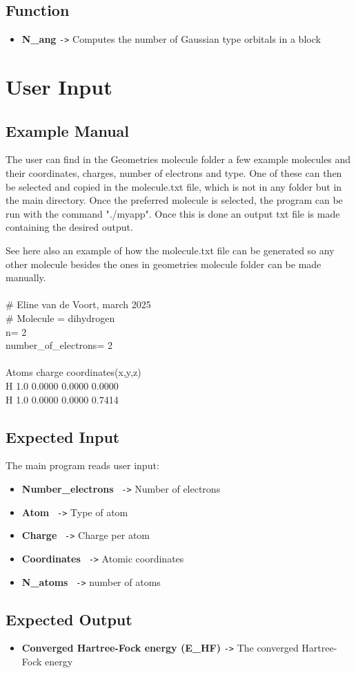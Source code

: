 \documentclass[11pt,a4paper]{article}
\begin{document}
\subsection*{Function}
\begin{itemize}
    \item \textbf{N\_ang} \texttt{->} Computes the number of Gaussian type orbitals in a block
\end{itemize}

\section*{User Input}
\subsection*{Example Manual}
The user can find in the Geometries molecule folder a few example molecules and their coordinates, charges, number of electrons and type. One of these can then be selected and copied in the molecule.txt file, which is not in any folder but in the main directory. Once the preferred molecule is selected, the program can be run with the command "./myapp". Once this is done an output txt file is made containing the desired output. 

See here also an example of how the molecule.txt file can be generated so any other molecule besides the ones in geometries molecule folder can be made manually. \\
\\
\# Eline van de Voort, march 2025 \\
\# Molecule = dihydrogen \\
n= 2 \\
number\_of\_electrons= 2 \\
\\
Atoms charge  coordinates(x,y,z) \\
H     1.0    0.0000	0.0000	0.0000 \\
H     1.0    0.0000	0.0000	0.7414 \\


\subsection*{Expected Input}
The main program reads user input:
\begin{itemize}
    \item \textbf{Number\_electrons} \texttt{ ->} Number of electrons
    \item \textbf{Atom} \texttt{ ->} Type of atom
    \item \textbf{Charge} \texttt{ ->} Charge per atom
    \item \textbf{Coordinates} \texttt{ ->} Atomic coordinates
    \item \textbf{N\_atoms} \texttt{ ->} number of atoms
\end{itemize}

\subsection*{Expected Output}
\begin{itemize}
    \item \textbf{Converged Hartree-Fock energy (E\_HF)} \texttt{->} The converged Hartree-Fock energy
\end{itemize}
\end{document}
